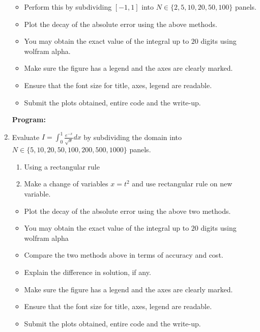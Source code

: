 \documentclass[a4paper,11pt]{report}
\begin{document}
\begin{enumerate}
    \begin{itemize}
    \item Perform this by subdividing $[-1, 1]$ into $N \in \{2, 5, 10, 20, 50, 100\}$ 
    panels.
    \item Plot the decay of the absolute error using the above methods.
    \item You may obtain the exact value of the integral up to $20$ digits using
    wolfram alpha.
    \item Make sure the figure has a legend and the axes are clearly marked.
    \item Ensure that the font size for title, axes, legend are readable.
    \item Submit the plots obtained, entire code and the write-up.
    \end{itemize}
        
    \textbf{Program:}
    

    \begin{figure}[ht!]
    \centering
    \resizebox{0.9\linewidth}{!}{}
    \end{figure}

    \item Evaluate $I = \displaystyle \int_{0}^{1} \frac{e^{-x}}{\sqrt{x}} dx$ by
    subdividing the domain into $N \in \{5, 10, 20, 50, 100, 200, 500, 1000\}$ panels.

    \begin{enumerate}
    \item Using a rectangular rule
    \item Make a change of variables $x = t^{2}$ and use rectangular rule on new variable.
    \end{enumerate}

    \begin{itemize}
    \item Plot the decay of the absolute error using the above two methods.
    \item You may obtain the exact value of the integral up to $20$ digits using wolfram alpha
    \item Compare the two methods above in terms of accuracy and cost.
    \item Explain the difference in solution, if any.
    \item Make sure the figure has a legend and the axes are clearly marked.
    \item Ensure that the font size for title, axes, legend are readable.
    \item Submit the plots obtained, entire code and the write-up.
    \end{itemize}


\end{enumerate}
\end{document}
